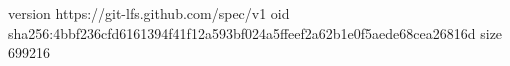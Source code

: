 version https://git-lfs.github.com/spec/v1
oid sha256:4bbf236cfd6161394f41f12a593bf024a5ffeef2a62b1e0f5aede68cea26816d
size 699216

